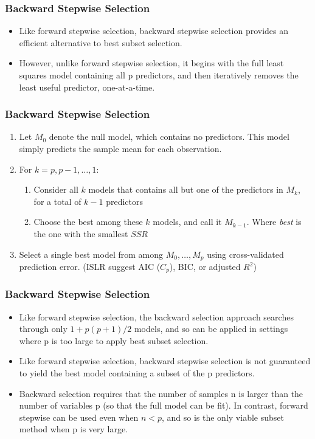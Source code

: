 \documentclass[
  shownotes,
  xcolor={svgnames},
  hyperref={colorlinks,citecolor=DarkBlue,linkcolor=DarkRed,urlcolor=DarkBlue}
  , aspectratio=169]{beamer}
\begin{document}
\begin{frame}[fragile]
\frametitle{Backward Stepwise Selection}

\begin{itemize}
\item Like forward stepwise selection, backward stepwise selection provides an efficient alternative to best subset selection.
\bigskip
\item However, unlike forward stepwise selection, it begins with the full least squares model containing all p predictors, and then iteratively removes the least useful predictor, one-at-a-time.
\end{itemize}

\end{frame}
\begin{frame}[fragile]
\frametitle{Backward Stepwise Selection}


\begin{enumerate}
\item Let $M_0$ denote the null model, which contains no predictors. This model simply predicts the sample mean for each observation.
\bigskip

\item  For $k=p,p-1,\dots,1$:
\medskip
\begin{enumerate}
\item Consider all $k$  models that contains all but one of the predictors in $M_k$, for a total of $k-1$ predictors
\medskip
\item Choose the best among these $k$ models, and call it $M_{k-1}$. Where {\it best} is the one with the smallest $SSR$
\end{enumerate}
\bigskip
\item Select a single best model from among $M_0,\dots, M_p$ using cross-validated prediction error. (ISLR suggest AIC ($C_p$), BIC, or adjusted $R^2$)
\end{enumerate}

\end{frame}
\begin{frame}[fragile]
\frametitle{Backward Stepwise Selection}

\begin{itemize}
\item Like forward stepwise selection, the backward selection approach searches through only $1 + p(p + 1)/2$ models, and so can be applied in settings where p is too large to apply best subset selection.
\medskip
\item  Like forward stepwise selection, backward stepwise selection is not guaranteed to yield the best model containing a subset of the p predictors.
\medskip
\item  Backward selection requires that the number of samples n is larger than the number of variables p (so that the full model can be fit). In contrast, forward stepwise can be used even when $n < p$, and so is the only viable subset method when p is very large.
\end{itemize}

\end{frame}
\end{document}
